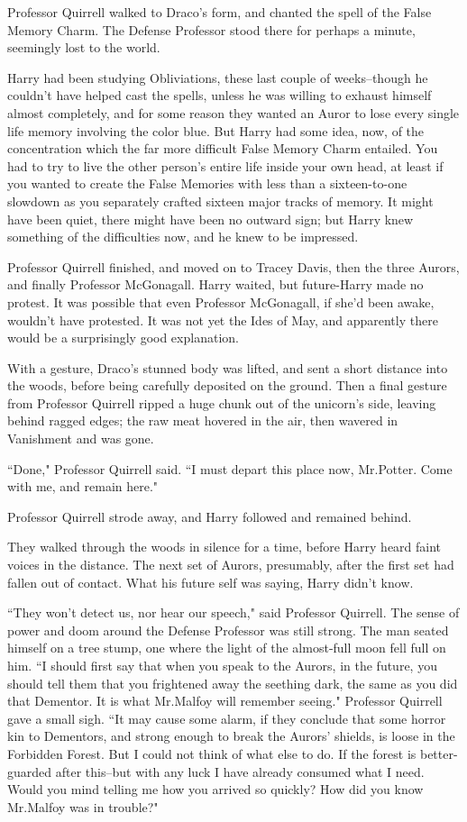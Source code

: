 Professor Quirrell walked to Draco's form, and chanted the spell of the False Memory Charm. The Defense Professor stood there for perhaps a minute, seemingly lost to the world.

Harry had been studying Obliviations, these last couple of weeks\---though he couldn't have helped cast the spells, unless he was willing to exhaust himself almost completely, and for some reason they wanted an Auror to lose every single life memory involving the color blue. But Harry had some idea, now, of the concentration which the far more difficult False Memory Charm entailed. You had to try to live the other person's entire life inside your own head, at least if you wanted to create the False Memories with less than a sixteen-to-one slowdown as you separately crafted sixteen major tracks of memory. It might have been quiet, there might have been no outward sign; but Harry knew something of the difficulties now, and he knew to be impressed.

Professor Quirrell finished, and moved on to Tracey Davis, then the three Aurors, and finally Professor McGonagall. Harry waited, but future-Harry made no protest. It was possible that even Professor McGonagall, if she'd been awake, wouldn't have protested. It was not yet the Ides of May, and apparently there would be a surprisingly good explanation.

With a gesture, Draco's stunned body was lifted, and sent a short distance into the woods, before being carefully deposited on the ground. Then a final gesture from Professor Quirrell ripped a huge chunk out of the unicorn's side, leaving behind ragged edges; the raw meat hovered in the air, then wavered in Vanishment and was gone.

``Done," Professor Quirrell said. ``I must depart this place now, Mr.\?Potter. Come with me, and remain here."

Professor Quirrell strode away, and Harry followed and remained behind.

They walked through the woods in silence for a time, before Harry heard faint voices in the distance. The next set of Aurors, presumably, after the first set had fallen out of contact. What his future self was saying, Harry didn't know.

``They won't detect us, nor hear our speech," said Professor Quirrell. The sense of power and doom around the Defense Professor was still strong. The man seated himself on a tree stump, one where the light of the almost-full moon fell full on him. ``I should first say that when you speak to the Aurors, in the future, you should tell them that you frightened away the seething dark, the same as you did that Dementor. It is what Mr.\?Malfoy will remember seeing." Professor Quirrell gave a small sigh. ``It may cause some alarm, if they conclude that some horror kin to Dementors, and strong enough to break the Aurors' shields, is loose in the Forbidden Forest. But I could not think of what else to do. If the forest is better-guarded after this\---but with any luck I have already consumed what I need. Would you mind telling me how you arrived so quickly? How did you know Mr.\?Malfoy was in trouble?"

